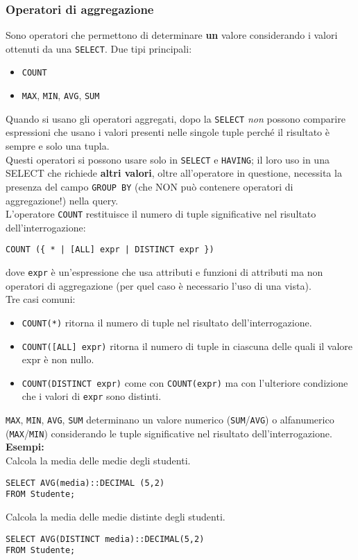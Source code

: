 \documentclass[a4paper, 10pt, titlepage]{article}
\begin{document}
	\subsubsection{Operatori di aggregazione}
		Sono operatori che permettono di determinare \textbf{un} valore considerando i
		valori ottenuti da una \lstinline|SELECT|.
		Due tipi principali:
		\begin{itemize}
			\item \lstinline|COUNT|
			\item \lstinline|MAX|, \lstinline|MIN|, \lstinline|AVG|, \lstinline|SUM|
		\end{itemize}
		Quando si usano gli operatori aggregati, dopo la \lstinline|SELECT| \textit{non} possono
		comparire espressioni che usano i valori presenti nelle singole tuple
		perché il risultato è sempre e solo una tupla. \\
		Questi operatori si possono usare solo in \lstinline|SELECT| e \lstinline|HAVING|; il loro uso in una SELECT che richiede \textbf{altri valori}, oltre all'operatore in questione, necessita la presenza del campo \lstinline|GROUP BY| (che NON può contenere operatori di aggregazione!) nella query. \bigskip \\
		L'operatore \lstinline|COUNT| restituisce il numero di tuple significative nel risultato dell’interrogazione:
		\begin{lstlisting}
COUNT ({ * | [ALL] expr | DISTINCT expr })
		\end{lstlisting}
		dove \lstinline|expr| è un’espressione che usa attributi e funzioni di attributi ma non
		operatori di aggregazione (per quel caso è necessario l'uso di una vista).\\
		Tre casi comuni:
		\begin{itemize}
			\item \lstinline|COUNT(*)| ritorna il numero di tuple nel risultato dell’interrogazione.
			\item \lstinline|COUNT([ALL] expr)| ritorna il numero di tuple in ciascuna delle quali il valore
			expr è non nullo.
			\item \lstinline|COUNT(DISTINCT expr)| come con \lstinline|COUNT(expr)| ma con l’ulteriore
			condizione che i valori di \lstinline|expr| sono distinti.
		\end{itemize} \medskip
		\lstinline|MAX|, \lstinline|MIN|, \lstinline|AVG|, \lstinline|SUM| determinano un valore numerico (\lstinline|SUM|/\lstinline|AVG|) o alfanumerico (\lstinline|MAX|/\lstinline|MIN|)
		considerando le tuple significative nel risultato dell’interrogazione.\medskip \\ 
		\textbf{Esempi: }\medskip \\
		Calcola la media delle medie degli studenti.
		\begin{lstlisting}
SELECT AVG(media)::DECIMAL (5,2)
FROM Studente;
		\end{lstlisting}
		Calcola la media delle medie distinte degli studenti.
		\begin{lstlisting}
SELECT AVG(DISTINCT media)::DECIMAL(5,2)
FROM Studente;
		\end{lstlisting}
		
\end{document}
